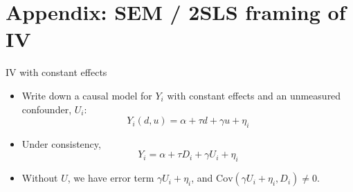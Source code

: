 \documentclass[xcolor=dvipsnames]{beamer}
\begin{document}

\appendix

\section{Appendix: SEM / 2SLS framing of IV}

\begin{frame}{IV with constant effects}

\begin{itemize}[<+->]
\item
  Write down a causal model for \(Y_i\) with constant effects and
  an unmeasured confounder, \(U_i\):
  \[Y_i(d,u) = \alpha + \tau d + \gamma u +\eta_i\]
\item Under consistency, 
\[
  Y_i  = \alpha + \tau D_i + \gamma U_i + \eta_i
  \]
\item
 Without $U$, we have error term $\gamma U_i + \eta_i$, and  \(\text{Cov}(\gamma U_i + \eta_i, D_i) \neq 0\).
\end{itemize}

\end{frame}
\end{document}
